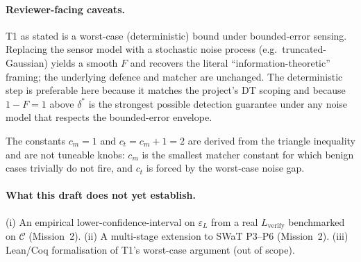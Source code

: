 \documentclass[11pt]{article}
\begin{document}
\paragraph{Reviewer-facing caveats.}
T1 as stated is a worst-case (deterministic) bound under bounded-error
sensing. Replacing the sensor model with a stochastic noise process
(e.g.\ truncated-Gaussian) yields a smooth $F$ and recovers the literal
``information-theoretic'' framing; the underlying defence and matcher are
unchanged. The deterministic step is preferable here because it matches
the project's DT scoping and because $1 - F = 1$ above $\delta^{*}$ is the
strongest possible detection guarantee under any noise model that
respects the bounded-error envelope.

The constants $c_m = 1$ and $c_t = c_m + 1 = 2$ are derived from the
triangle inequality and are not tuneable knobs: $c_m$ is the smallest
matcher constant for which benign cases trivially do not fire, and $c_t$ is
forced by the worst-case noise gap.

\paragraph{What this draft does not yet establish.}
(i) An empirical lower-confidence-interval on $\varepsilon_L$ from a real
$L_{\text{verify}}$ benchmarked on $\mathcal{C}$ (Mission~2). (ii) A
multi-stage extension to SWaT P3--P6 (Mission~2). (iii) Lean/Coq
formalisation of T1's worst-case argument (out of scope).
\end{document}
